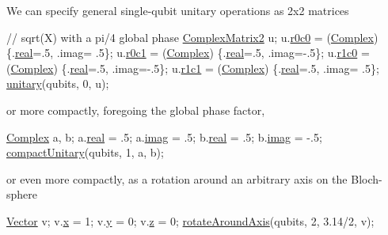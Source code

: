 We can specify general single-\/qubit unitary operations as 2x2 matrices 
\begin{DoxyCode}
\textcolor{comment}{// sqrt(X) with a pi/4 global phase}
\mbox{\hyperlink{structComplexMatrix2}{ComplexMatrix2}} u;
u.\mbox{\hyperlink{structComplexMatrix2_ae72b4458233b077a636beee1892e81ff}{r0c0}} = (\mbox{\hyperlink{QuEST_8h_ad59c9e471673c07782e6c403277ffd8d}{Complex}}) \{.\mbox{\hyperlink{structComplex_a479ad939835457595fcca3ca55c06283}{real}}=.5, .imag= .5\};
u.\mbox{\hyperlink{structComplexMatrix2_a0f3932f055a8b05cef361bce25d51172}{r0c1}} = (\mbox{\hyperlink{QuEST_8h_ad59c9e471673c07782e6c403277ffd8d}{Complex}}) \{.\mbox{\hyperlink{structComplex_a479ad939835457595fcca3ca55c06283}{real}}=.5, .imag=-.5\}; 
u.\mbox{\hyperlink{structComplexMatrix2_ab98282015ed2065e53fbc9638e2583ab}{r1c0}} = (\mbox{\hyperlink{QuEST_8h_ad59c9e471673c07782e6c403277ffd8d}{Complex}}) \{.\mbox{\hyperlink{structComplex_a479ad939835457595fcca3ca55c06283}{real}}=.5, .imag=-.5\};
u.\mbox{\hyperlink{structComplexMatrix2_a763007c3070802373549ba0350f83c8a}{r1c1}} = (\mbox{\hyperlink{QuEST_8h_ad59c9e471673c07782e6c403277ffd8d}{Complex}}) \{.\mbox{\hyperlink{structComplex_a479ad939835457595fcca3ca55c06283}{real}}=.5, .imag= .5\};
\mbox{\hyperlink{QuEST__env__local_8c_a7a0877e33700f6bad48adb51b7b3fb67}{unitary}}(qubits, 0, u);
\end{DoxyCode}
 or more compactly, foregoing the global phase factor, 
\begin{DoxyCode}
\mbox{\hyperlink{structComplex}{Complex}} a, b;
a.\mbox{\hyperlink{structComplex_a479ad939835457595fcca3ca55c06283}{real}} = .5; a.\mbox{\hyperlink{structComplex_a1151948284b21c0052f203f23ab931d9}{imag}} =  .5;
b.\mbox{\hyperlink{structComplex_a479ad939835457595fcca3ca55c06283}{real}} = .5; b.\mbox{\hyperlink{structComplex_a1151948284b21c0052f203f23ab931d9}{imag}} = -.5;
\mbox{\hyperlink{QuEST__env__local_8c_a03b13dfcabd8c59b50dbdd3af44ba8b2}{compactUnitary}}(qubits, 1, a, b);
\end{DoxyCode}
 or even more compactly, as a rotation around an arbitrary axis on the Bloch-\/sphere 
\begin{DoxyCode}
\mbox{\hyperlink{structVector}{Vector}} v;
v.\mbox{\hyperlink{structVector_aac7abe171ba4bada50ed72acba6259fc}{x}} = 1; v.\mbox{\hyperlink{structVector_a375ca805d4c808a53d7c4e0c737ae3de}{y}} = 0; v.\mbox{\hyperlink{structVector_ad4e863651be7d6b7e2b28cd7445a0ccf}{z}} = 0;
\mbox{\hyperlink{QuEST_8c_a8810423457803005fecd415f4299f40d}{rotateAroundAxis}}(qubits, 2, 3.14/2, v);
\end{DoxyCode}


